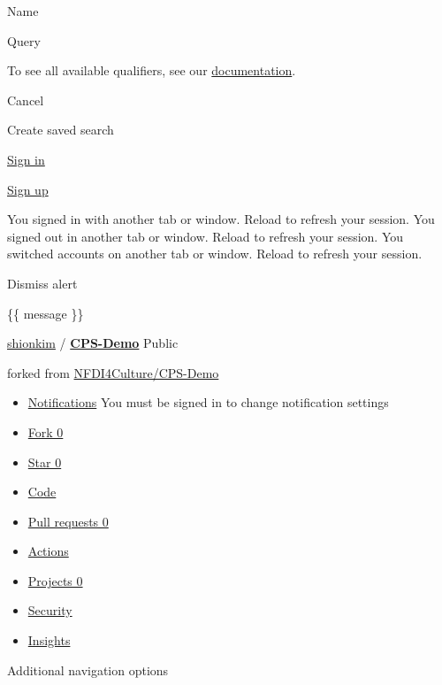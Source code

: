 \documentclass[
  letterpaper,
]{book}
\begin{document}
Name

Query

To see all available qualifiers, see our
\href{https://docs.github.com/search-github/github-code-search/understanding-github-code-search-syntax}{documentation}.

Cancel

Create saved search

\href{./login?return_to=https\%3A\%2F\%2Fgithub.com\%2Fshionkim\%2FCPS-Demo\%2Fblob\%2Fmain\%2Ftext\%2Fwildkatzenjagd.html}{Sign
in}

\href{./signup?ref_cta=Sign+up&ref_loc=header+logged+out&ref_page=\%2F\%3Cuser-name\%3E\%2F\%3Crepo-name\%3E\%2Fblob\%2Fshow&source=header-repo&source_repo=shionkim\%2FCPS-Demo}{Sign
up}

You signed in with another tab or window. Reload to refresh your
session. You signed out in another tab or window. Reload to refresh your
session. You switched accounts on another tab or window. Reload to
refresh your session.

Dismiss alert

\{\{ message \}\}

\href{./shionkim}{shionkim} /
\textbf{\href{./shionkim/CPS-Demo}{CPS-Demo}} Public

forked from \href{./NFDI4Culture/CPS-Demo}{NFDI4Culture/CPS-Demo}

\begin{itemize}
\item
  \href{./login?return_to=\%2Fshionkim\%2FCPS-Demo}{Notifications} You
  must be signed in to change notification settings
\item
  \href{./login?return_to=\%2Fshionkim\%2FCPS-Demo}{Fork 0}
\item
  \href{./login?return_to=\%2Fshionkim\%2FCPS-Demo}{Star 0}
\item
  \href{./shionkim/CPS-Demo}{Code}
\item
  \href{./shionkim/CPS-Demo/pulls}{Pull requests 0}
\item
  \href{./shionkim/CPS-Demo/actions}{Actions}
\item
  \href{./shionkim/CPS-Demo/projects}{Projects 0}
\item
  \href{./shionkim/CPS-Demo/security}{Security}
\item
  \href{./shionkim/CPS-Demo/pulse}{Insights}
\end{itemize}

Additional navigation options
\end{document}
